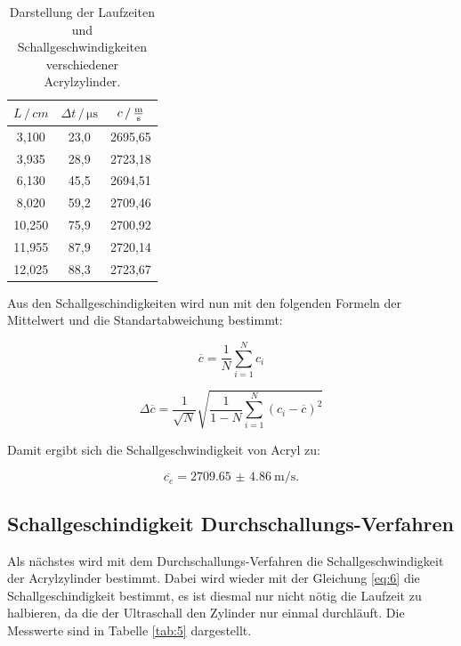 \begin{table}[H]
  \centering
  \caption{Darstellung der Laufzeiten und Schallgeschwindigkeiten verschiedener
  Acrylzylinder.}
  \label{tab:4}
  \begin{tabular}{c c c}
    \toprule
    $L \, / \, cm$ & $\Delta t \, / \, \si{\micro\second}$ & $c \, / \, \si[per-mode=fraction]{\meter\per\second}$ \\
    \midrule
     3,100 & 23,0 & 2695,65 \\
     3,935 & 28,9 & 2723,18 \\
     6,130 & 45,5 & 2694,51 \\
     8,020 & 59,2 & 2709,46 \\
    10,250 & 75,9 & 2700,92 \\
    11,955 & 87,9 & 2720,14 \\
    12,025 & 88,3 & 2723,67 \\
    \bottomrule
  \end{tabular}
\end{table}

Aus den Schallgeschindigkeiten wird nun mit den folgenden Formeln der Mittelwert und
die Standartabweichung bestimmt:

\begin{equation}
  \overline{c} = \frac{1}{N} \sum_{i=1}^N c_i
  \label{eq:7}
\end{equation}

\begin{equation}
  \Delta \overline{c} = \frac{1}{\sqrt{N}} \sqrt{\frac{1}{1-N} \sum_{i=1}^N (c_i - \overline{c})^2}
  \label{eq:8}
\end{equation}

Damit ergibt sich die Schallgeschwindigkeit von Acryl zu:

\begin{equation*}
  \overline{c_e} = \SI{2709.65(486)}{\meter\per\second}.
\end{equation*}

\subsection{Schallgeschindigkeit Durchschallungs-Verfahren}

Als nächstes wird mit dem Durchschallungs-Verfahren die Schallgeschwindigkeit
der Acrylzylinder bestimmt. Dabei wird wieder mit der Gleichung \ref{eq:6} die
Schallgeschindigkeit bestimmt, es ist diesmal nur nicht nötig die Laufzeit zu halbieren,
da die der Ultraschall den Zylinder nur einmal durchläuft. Die Messwerte sind in
Tabelle \ref{tab:5} dargestellt.

